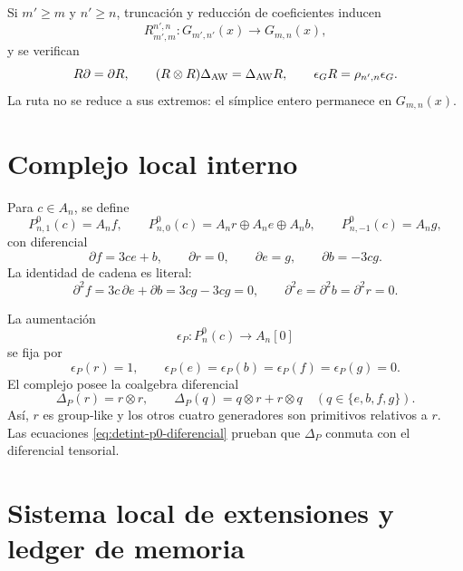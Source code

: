 Si \(m'\ge m\) y \(n'\ge n\), truncación y reducción de coeficientes
inducen
\begin{equation}\label{eq:detint-rmn}
 R_{m',m}^{n',n}:G_{m',n'}(x)\longrightarrow G_{m,n}(x),
\end{equation}
y se verifican
\begin{equation}\label{eq:detint-aw-natural}
 R\partial=\partial R,
 \qquad
 (R\otimes R)\Delta_{\rm AW}=\Delta_{\rm AW}R,
 \qquad
 \epsilon_GR=\rho_{n',n}\epsilon_G.
\end{equation}
La ruta no se reduce a sus extremos: el símplice entero permanece en
\(G_{m,n}(x)\).

\iffalse
\section{Complejo local interno}

Para \(c\in A_n\), se define
\begin{equation}\label{eq:detint-p0-grados}
 P^0_{n,1}(c)=A_nf,
 \qquad
 P^0_{n,0}(c)=A_nr\oplus A_ne\oplus A_nb,
 \qquad
 P^0_{n,-1}(c)=A_ng,
\end{equation}
con diferencial
\begin{equation}\label{eq:detint-p0-diferencial}
 \partial f=3ce+b,
 \qquad
 \partial r=0,
 \qquad
 \partial e=g,
 \qquad
 \partial b=-3cg.
\end{equation}
La identidad de cadena es literal:
\begin{equation}\label{eq:detint-d2}
 \partial^2f=3c\,\partial e+\partial b=3cg-3cg=0,
 \qquad
 \partial^2e=\partial^2b=\partial^2r=0.
\end{equation}

La aumentación
\begin{equation}\label{eq:detint-epsilon-p}
 \epsilon_P:P_n^0(c)\longrightarrow A_n[0]
\end{equation}
se fija por
\[
 \epsilon_P(r)=1,
 \qquad
 \epsilon_P(e)=\epsilon_P(b)=\epsilon_P(f)=\epsilon_P(g)=0.
\]
El complejo posee la coalgebra diferencial
\begin{equation}\label{eq:detint-coalgebra-p}
 \Delta_P(r)=r\otimes r,
 \qquad
 \Delta_P(q)=q\otimes r+r\otimes q
 \quad(q\in\{e,b,f,g\}).
\end{equation}
Así, \(r\) es group-like y los otros cuatro generadores son primitivos
relativos a \(r\). Las ecuaciones
\eqref{eq:detint-p0-diferencial} prueban que \(\Delta_P\) conmuta con el
diferencial tensorial.

\section{Sistema local de extensiones y ledger de memoria}

